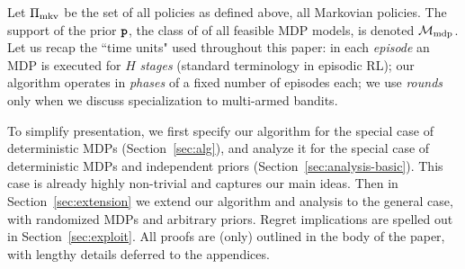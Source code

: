 Let $\Pi_{\mathrm{mkv}}$ be the set of all policies as defined above, \ie all Markovian policies.
The support of the prior ${\normalfont \texttt{\textbf{p}}}$, \ie the class of of all feasible MDP models, is denoted $\mathcal{M}_{\mathrm{mdp}}$. Let us recap the ``time units" used throughout this paper: in each \emph{episode} an MDP is executed for $H$ \emph{stages} (standard terminology in episodic RL); our algorithm operates in \emph{phases} of a fixed number of episodes each; we use \emph{rounds} only when we discuss specialization to multi-armed bandits.

To simplify presentation, we first specify our algorithm for the special case of  deterministic MDPs (Section~\ref{sec:alg}), and analyze it for the special case of deterministic MDPs and independent priors (Section~\ref{sec:analysis-basic}). This case is already highly non-trivial and captures our main ideas. Then in Section~\ref{sec:extension} we extend our algorithm and analysis to the general case, with randomized MDPs and arbitrary priors. Regret implications are spelled out in Section~\ref{sec:exploit}. All proofs are (only) outlined in the body of the paper, with lengthy details deferred to the appendices.
